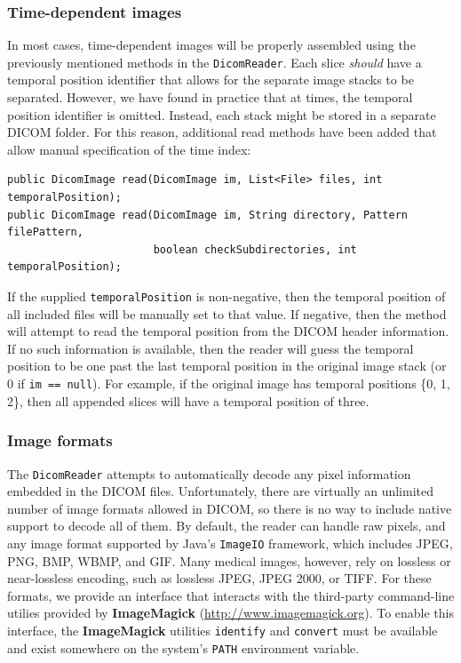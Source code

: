 \subsubsection{Time-dependent images}

In most cases, time-dependent images will be properly assembled using the previously mentioned
methods in the \lstinline{DicomReader}.  Each slice \emph{should} have a temporal position
identifier that allows for the separate image stacks to be separated.  However, we have found
in practice that at times, the temporal position identifier is omitted.  Instead, each stack
might be stored in a separate DICOM folder.  For this reason, additional read methods have
been added that allow manual specification of the time index:
\begin{lstlisting}[]
public DicomImage read(DicomImage im, List<File> files, int temporalPosition);
public DicomImage read(DicomImage im, String directory, Pattern filePattern, 
                       boolean checkSubdirectories, int temporalPosition);
\end{lstlisting}
If the supplied \lstinline{temporalPosition} is non-negative, then the temporal
position of all included files will be manually set to that value.  If negative,
then the method will attempt to read the temporal position from the DICOM header
information.  If no such information is available, then the reader will guess the 
temporal position to be one past the last temporal position in the original image
stack (or 0 if \lstinline{im == null}).  For example, if the original
image has temporal positions \{0, 1, 2\}, then all appended slices will have
a temporal position of three.

\subsubsection{Image formats \label{sec:dicom:formats}}

The \lstinline{DicomReader} attempts to automatically decode any pixel information 
embedded in the DICOM files.  Unfortunately, there are virtually an unlimited number
of image formats allowed in DICOM, so there is no way to include native
support to decode all of them.  By default, the reader can handle raw pixels,
and any image format supported by Java's \lstinline{ImageIO} framework,
which includes JPEG, PNG, BMP, WBMP, and GIF.  Many medical images, however,
rely on lossless or near-lossless encoding, such as lossless JPEG, JPEG 2000, or TIFF.
For these formats, we provide an interface that interacts with the third-party
command-line utilies provided by \textbf{ImageMagick} (\url{http://www.imagemagick.org}).
To enable this interface, the \textbf{ImageMagick} utilities \texttt{identify} and 
\texttt{convert} must be available and exist somewhere on the system's \texttt{PATH}
environment variable.

